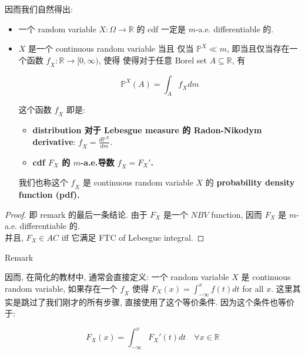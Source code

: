 因而我们自然得出:

\begin{theorem}{}

\begin{itemize}
\item
  一个 random variable \(\mathit{X}:\Omega\rightarrow\mathbb{R}\) 的 cdf 一定是 \(\mathit{m}\)-a.e. differentiable 的.
\item
  \(\mathit{X}\) 是一个 continuous random variable 当且 仅当 \(\mathbb{P}^{\mathit{X}} \ll \mathit{m}\), 即当且仅当存在一个函数 \(\mathit{f}_{\mathit{X}}:\mathbb{R}\rightarrow\lbrack 0,\infty)\), 使得 使得对于任意 Borel set \(\mathit{A} \subseteq \mathbb{R}\), 有

  \[\mathbb{P}^{\mathit{X}}(\mathit{A}) = \int_{\mathit{A}}\mathit{f}_{\mathit{X}}\mathit{d}\mathit{m}\]

  这个函数 \(\mathit{f}_{\mathit{X}}\) 即是:

  \begin{itemize}
  \item
    \textbf{distribution 对于 Lebesgue measure 的 Radon-Nikodym derivative}: \(\mathit{f}_{\mathit{X}} = \frac{\mathit{d}\mathbb{P}^{\mathit{X}}}{\mathit{d}\mathit{m}}\).
  \item
    \textbf{cdf \(\mathit{F}_{\mathit{X}}\) 的 \(\mathit{m}\)-a.e.导数 \(\mathit{f}_{\mathit{X}} = \mathit{F}_{\mathit{X}}'\).}
  \end{itemize}

  我们也称这个 \(\mathit{f}_{\mathit{X}}\) 是 continuous random variable \(\mathit{X}\) 的 \textbf{probability density function (pdf).}
\end{itemize}

\end{theorem}

\begin{proof}

即 remark 的最后一条结论. 由于 \(\mathit{F}_{\mathit{X}}\) 是一个 \(\mathit{N}\mathit{B}\mathit{V}\) function, 因而 \(\mathit{F}_{\mathit{X}}\) 是 \(\mathit{m}\)-a.e. differentiable 的.\\
并且, \(\mathit{F}_{\mathit{X}} \in \mathit{A}\mathit{C}\) iff 它满足 FTC of Lebesgue integral.

\end{proof}

\begin{qlremark}{Remark}

因而, 在简化的教材中, 通常会直接定义: 一个 random variable \(\mathit{X}\) 是 continuous random variable, 如果存在一个 \(\mathit{f}_{\mathit{X}}\) 使得 \(\mathit{F}_{\mathit{X}}(\mathit{x}) = \int_{- \infty}^{\mathit{x}}\mathit{f}(\mathit{t})\mathit{d}\mathit{t}\) for all \(\mathit{x}\). 这里其实是跳过了我们刚才的所有步骤, 直接使用了这个等价条件. 因为这个条件也等价于:

\[\mathit{F}_{\mathit{X}}(\mathit{x}) = \int_{- \infty}^{\mathit{x}}\mathit{F}_{\mathit{X}}'(\mathit{t})\mathit{d}\mathit{t}\quad\forall\mathit{x} \in \mathbb{R}\]

\end{qlremark}

